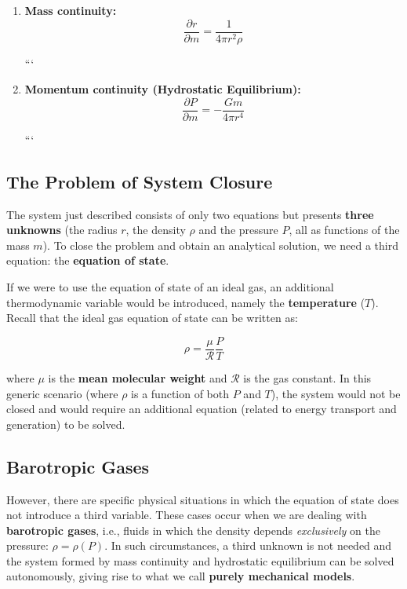 \begin{enumerate}
\item \textbf{Mass continuity:}
\begin{equation}
\frac{\partial r}{\partial m} = \frac{1}{4\pi r^2 \rho}
\end{equation}

```
\item \textbf{Momentum continuity (Hydrostatic Equilibrium):}
\begin{equation}
    \frac{\partial P}{\partial m} = -\frac{G m}{4\pi r^4}
\end{equation}


```

\end{enumerate}

\subsection{The Problem of System Closure}

The system just described consists of only two equations but presents \textbf{three unknowns} (the radius $r$, the density $\rho$ and the pressure $P$, all as functions of the mass $m$).
To close the problem and obtain an analytical solution, we need a third equation: the \textbf{equation of state}.

If we were to use the equation of state of an ideal gas, an additional thermodynamic variable would be introduced, namely the \textbf{temperature} ($T$). Recall that the ideal gas equation of state can be written as:

\begin{equation}
\rho = \frac{\mu}{\mathcal{R}} \frac{P}{T}
\end{equation}

where $\mu$ is the \textbf{mean molecular weight} and $\mathcal{R}$ is the gas constant. In this generic scenario (where $\rho$ is a function of both $P$ and $T$), the system would not be closed and would require an additional equation (related to energy transport and generation) to be solved.

\subsection{Barotropic Gases}

However, there are specific physical situations in which the equation of state does not introduce a third variable. These cases occur when we are dealing with \textbf{barotropic gases}, i.e., fluids in which the density depends \textit{exclusively} on the pressure: $\rho = \rho(P)$. In such circumstances, a third unknown is not needed and the system formed by mass continuity and hydrostatic equilibrium can be solved autonomously, giving rise to what we call \textbf{purely mechanical models}.

